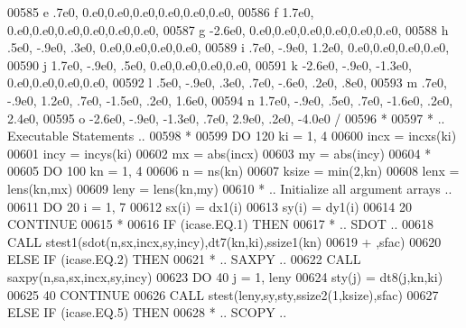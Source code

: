 \begin{DoxyCode}
00585      e            .7e0,                  0.e0,0.e0,0.e0,0.e0,0.e0,0.e0,
00586      f           1.7e0,                  0.e0,0.e0,0.e0,0.e0,0.e0,0.e0,
00587      g          -2.6e0,                  0.e0,0.e0,0.e0,0.e0,0.e0,0.e0,
00588      h            .5e0,  -.9e0,   .3e0,             0.e0,0.e0,0.e0,0.e0,
00589      i            .7e0,  -.9e0,  1.2e0,             0.e0,0.e0,0.e0,0.e0,
00590      j           1.7e0,  -.9e0,   .5e0,             0.e0,0.e0,0.e0,0.e0,
00591      k          -2.6e0,  -.9e0, -1.3e0,             0.e0,0.e0,0.e0,0.e0,
00592      l            .5e0,  -.9e0,   .3e0,   .7e0,  -.6e0,   .2e0,   .8e0,
00593      m            .7e0,  -.9e0,  1.2e0,   .7e0, -1.5e0,   .2e0,  1.6e0,
00594      n           1.7e0,  -.9e0,   .5e0,   .7e0, -1.6e0,   .2e0,  2.4e0,
00595      o          -2.6e0,  -.9e0, -1.3e0,   .7e0,  2.9e0,   .2e0, -4.0e0 /
00596 \textcolor{comment}{*}
00597 \textcolor{comment}{*     .. Executable Statements ..}
00598 \textcolor{comment}{*}
00599       \textcolor{keywordflow}{DO} 120 ki = 1, 4
00600          incx = incxs(ki)
00601          incy = incys(ki)
00602          mx = abs(incx)
00603          my = abs(incy)
00604 \textcolor{comment}{*}
00605          \textcolor{keywordflow}{DO} 100 kn = 1, 4
00606             n = ns(kn)
00607             ksize = min(2,kn)
00608             lenx = lens(kn,mx)
00609             leny = lens(kn,my)
00610 \textcolor{comment}{*           .. Initialize all argument arrays ..}
00611             \textcolor{keywordflow}{DO} 20 i = 1, 7
00612                sx(i) = dx1(i)
00613                sy(i) = dy1(i)
00614    20       \textcolor{keywordflow}{CONTINUE}
00615 \textcolor{comment}{*}
00616             \textcolor{keywordflow}{IF} (icase.EQ.1) \textcolor{keywordflow}{THEN}
00617 \textcolor{comment}{*              .. SDOT ..}
00618                \textcolor{keyword}{CALL }stest1(sdot(n,sx,incx,sy,incy),dt7(kn,ki),ssize1(kn)
00619      +                     ,sfac)
00620             \textcolor{keywordflow}{ELSE} \textcolor{keywordflow}{IF} (icase.EQ.2) \textcolor{keywordflow}{THEN}
00621 \textcolor{comment}{*              .. SAXPY ..}
00622                \textcolor{keyword}{CALL }saxpy(n,sa,sx,incx,sy,incy)
00623                \textcolor{keywordflow}{DO} 40 j = 1, leny
00624                   sty(j) = dt8(j,kn,ki)
00625    40          \textcolor{keywordflow}{CONTINUE}
00626                \textcolor{keyword}{CALL }stest(leny,sy,sty,ssize2(1,ksize),sfac)
00627             \textcolor{keywordflow}{ELSE} \textcolor{keywordflow}{IF} (icase.EQ.5) \textcolor{keywordflow}{THEN}
00628 \textcolor{comment}{*              .. SCOPY ..}

\end{DoxyCode}

